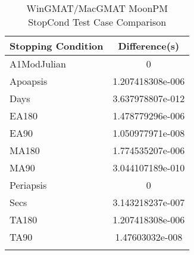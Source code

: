 \begin{table}[htbp!]
\centering
\caption{ WinGMAT/MacGMAT MoonPM StopCond Test Case Comparison}
      \begin{tabular}{lc}
      \hline\hline
          Stopping Condition & Difference(s) \\
         \hline
         A1ModJulian & 0 \\
         Apoapsis & 1.207418308e-006 \\
         Days & 3.637978807e-012 \\
         EA180 & 1.478779296e-006 \\
         EA90 & 1.050977971e-008 \\
         MA180 & 1.774535207e-006 \\
         MA90 & 3.044107189e-010 \\
         Periapsis & 0 \\
         Secs & 3.143218237e-007 \\
         TA180 & 1.207418308e-006 \\
         TA90 & 1.47603032e-008 \\
      \hline\hline
      \label{Table: WinGMAT-MacGMAT MoonPM StopCond Table} 
\end{tabular}
\end{table}
